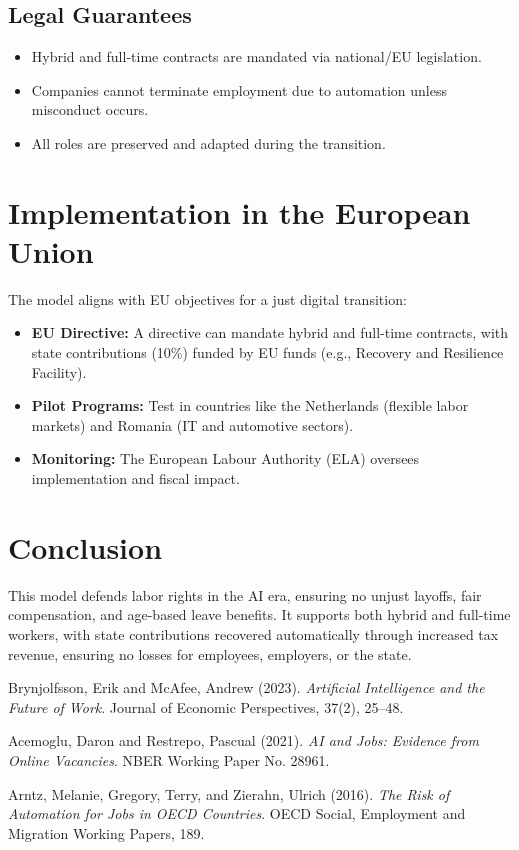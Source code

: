\documentclass[12pt]{article}
\begin{document}
\subsection{Legal Guarantees}
\begin{itemize}
  \item Hybrid and full-time contracts are mandated via national/EU legislation.
  \item Companies cannot terminate employment due to automation unless misconduct occurs.
  \item All roles are preserved and adapted during the transition.
\end{itemize}

\section{Implementation in the European Union}
The model aligns with EU objectives for a just digital transition:
\begin{itemize}
  \item \textbf{EU Directive:} A directive can mandate hybrid and full-time contracts, with state contributions (10\%) funded by EU funds (e.g., Recovery and Resilience Facility).
  \item \textbf{Pilot Programs:} Test in countries like the Netherlands (flexible labor markets) and Romania (IT and automotive sectors).
  \item \textbf{Monitoring:} The European Labour Authority (ELA) oversees implementation and fiscal impact.
\end{itemize}

\section{Conclusion}
This model defends labor rights in the AI era, ensuring no unjust layoffs, fair compensation, and age-based leave benefits. It supports both hybrid and full-time workers, with state contributions recovered automatically through increased tax revenue, ensuring no losses for employees, employers, or the state.

\begin{thebibliography}{9}
Brynjolfsson, Erik and McAfee, Andrew (2023). \textit{Artificial Intelligence and the Future of Work}. Journal of Economic Perspectives, 37(2), 25--48.

Acemoglu, Daron and Restrepo, Pascual (2021). \textit{AI and Jobs: Evidence from Online Vacancies}. NBER Working Paper No. 28961.

Arntz, Melanie, Gregory, Terry, and Zierahn, Ulrich (2016). \textit{The Risk of Automation for Jobs in OECD Countries}. OECD Social, Employment and Migration Working Papers, 189.
\end{thebibliography}
\end{document}
